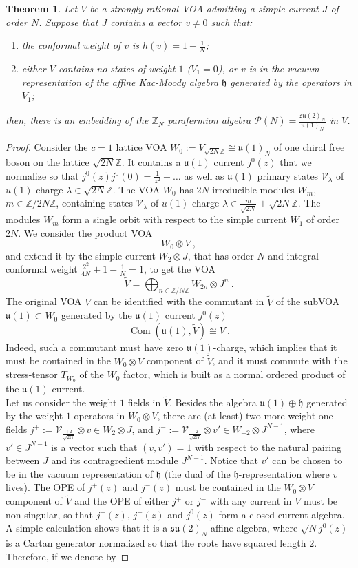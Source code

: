 \documentclass[11pt,reqno]{article}
\newcommand{\be}{\begin{equation}}
\newcommand{\ee}{\end{equation}}
\newcommand{\CV}{\mathcal{V}}
\DeclareMathOperator{\Com}{Com}
\newcommand{\ZZ}{\mathbb{Z}}
\newcommand{\paraf}{\mathcal{P}}
\newcommand{\alg}[1]{\mathfrak{#1}}
\newtheorem{theorem}{Theorem}
\begin{document}
\begin{theorem}\label{th:simplecurrent}
	Let $V$ be a strongly rational VOA admitting a simple current $J$ of order $N$.  Suppose that $J$ contains a vector $v\neq 0$ such that:
	\begin{enumerate}
		\item the conformal weight of $v$ is $h(v)=1-\frac{1}{N}$;
		\item either $V$ contains no states of weight $1$ ($V_1=0$), or $v$ is in the vacuum representation of the affine Kac-Moody algebra $\alg{h}$ generated by the operators in $V_1$;
	\end{enumerate}
then, there is an embedding of the $\ZZ_N$ parafermion algebra $\paraf(N)=\frac{\alg{su}(2)_N}{\alg{u}(1)_N}$ in $V$.
\end{theorem}
\begin{proof}
	Consider the $c=1$ lattice VOA $W_0:=V_{\sqrt{2N}\ZZ}\cong \alg{u}(1)_N$ of one chiral free boson on the lattice $\sqrt{2N}\ZZ$. It contains a $\alg{u}(1)$ current $j^0(z)$ that we normalize so that $j^0(z)j^0(0)=\frac{1}{z^2}+\ldots$ as well as $\alg{u}(1)$ primary states $\CV_\lambda$ of $u(1)$-charge $\lambda\in \sqrt{2N}\ZZ$. The VOA $W_0$ has $2N$ irreducible modules $W_m$, $m\in \ZZ/2N\ZZ$, containing states $\CV_\lambda$ of $u(1)$-charge $\lambda\in \frac{m}{\sqrt{2N}}+\sqrt{2N}\ZZ$. The modules $W_m$ form a single orbit with respect to the simple current $W_1$ of order $2N$. 
	We consider the product VOA
	\be W_0\otimes V\ ,
	\ee and extend it by the simple current $W_2\otimes J$, that has order $N$ and integral conformal weight $\frac{2^2}{4N}+1-\frac{1}{N}=1$, to get the VOA
	\be \tilde V=\bigoplus_{n\in \ZZ/N\ZZ} W_{2n}\otimes J^n\ .
	\ee The original VOA $V$ can be identified with the commutant  in $\tilde V$ of the subVOA $\alg{u}(1)\subset W_0$ generated by the $\alg{ u}(1)$ current $j^0(z)$
	\be \Com(\alg{u}(1),{\tilde V})\cong V\ .
	\ee Indeed, such a commutant must have zero $\alg{u}(1)$-charge, which implies that it must be contained in the $W_0\otimes V$ component of $\tilde V$, and it must commute with the stress-tensor $T_{W_0}$ of the $W_0$ factor, which is built as a normal ordered product of the $\alg{u}(1)$ current.\\
	Let us consider the weight $1$ fields in $\tilde V$. Besides the algebra $\alg{u}(1)\oplus \alg{h}$ generated by the weight $1$ operators in $W_0\otimes V$, there are (at least) two more weight one fields $j^+:=\CV_{\frac{+2}{\sqrt{2N}}}\otimes v \in W_2\otimes J$, and $j^-:=\CV_{\frac{-2}{\sqrt{2N}}}\otimes v' \in W_{-2}\otimes J^{N-1}$, where $v'\in J^{N-1}$ is a vector such that $(v,v')=1$ with respect to the natural pairing between $J$ and its contragredient module $J^{N-1}$. Notice that $v'$ can be chosen to be in the vacuum representation of $\alg{h}$ (the dual of the $\alg{h}$-representation where $v$ lives). The OPE of $j^+(z)$ and $j^-(z)$ must be contained in the $W_0\otimes V$ component of $\tilde V$ and the OPE of either $j^+$ or $j^-$ with any current in $V$ must be non-singular, so that $j^+(z)$, $j^-(z)$ and $j^0(z)$ form a closed current algebra. A simple calculation shows that it is a $\alg{su}(2)_N$ affine algebra, where $\sqrt{N}j^0(z)$ is a Cartan generator normalized so that the roots have squared length $2$. Therefore, if we denote by

\end{proof}
\end{document}
